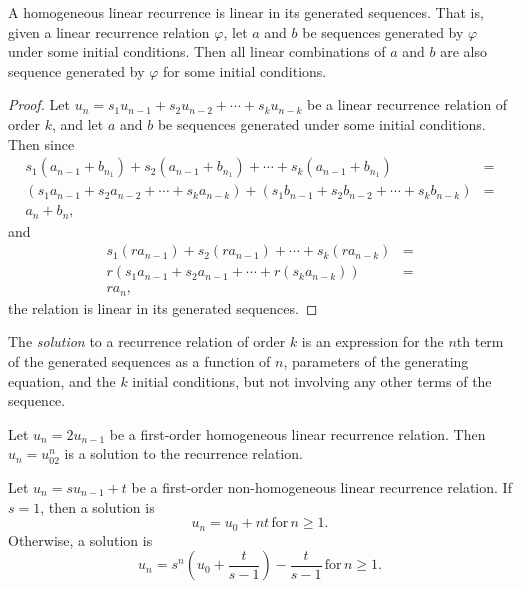 \begin{prop}\label{linear-combinations-are-recurrence-solutions}
    A homogeneous linear recurrence is linear in its generated sequences. That is, given a linear recurrence relation $\varphi$, let $a$ and $b$ be sequences generated by $\varphi$ under some initial conditions. Then all linear combinations of $a$ and $b$ are also sequence generated by $\varphi$ for some initial conditions.
\end{prop}

\begin{proof}
    Let $u_n = s_1u_{n-1} + s_2u_{n-2} + \cdots + s_ku_{n-k}$ be a linear recurrence relation of order $k$, and let $a$ and $b$ be sequences generated under some initial conditions. Then since
    \begin{align*}
        s_1(a_{n-1} + b_{n_1}) + s_2(a_{n-1} + b_{n_1}) + \cdots + s_k(a_{n-1} + b_{n_1}) & = \\ (s_1a_{n-1} + s_2a_{n-2} + \cdots + s_ka_{n-k}) + (s_1b_{n-1} + s_2b_{n-2} + \cdots + s_kb_{n-k}) & = \\
        a_n + b_n, &
    \end{align*}
    and
    \begin{align*}
        s_1(ra_{n-1}) + s_2(ra_{n-1}) + \cdots + s_k(ra_{n-k}) & = \\
        r(s_1a_{n-1} + s_2a_{n-1} + \cdots + r(s_ka_{n-k})) & = \\
        ra_n, &
    \end{align*}
    the relation is linear in its generated sequences.
\end{proof}

\begin{defn}
    The \emph{solution} to a recurrence relation of order $k$ is an expression for the $n$th term of the generated sequences as a function of $n$, parameters of the generating equation, and the $k$ initial conditions, but not involving any other terms of the sequence.
\end{defn}

\begin{exmp}
    Let $u_n = 2u_{n-1}$ be a first-order homogeneous linear recurrence relation. Then $u_n = u_02^n$ is a solution to the recurrence relation.
\end{exmp}

\begin{thm}
    Let $u_n = su_{n-1} + t$ be a first-order non-homogeneous linear recurrence relation. If $s = 1$, then a solution is \[u_n = u_0 + nt \,\textrm{for}\, n \geq 1.\] Otherwise, a solution is \[u_n = s^n(u_0 + \frac{t}{s-1}) - \frac{t}{s-1} \,\textrm{for}\, n \geq 1.\]
\end{thm}

